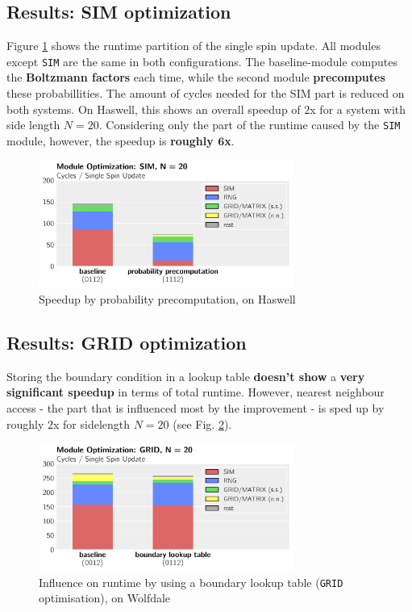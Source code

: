 \documentclass[letterpaper]{article}
\begin{document}
\subsection{Results: SIM optimization} \label{res:SIM}
Figure \ref{SIM:Has:20} shows the runtime partition of the single spin update. All modules except \texttt{SIM} are the same in both configurations. The baseline-module computes the \textbf{Boltzmann factors} each time, while the second module \textbf{precomputes} these probabillities. The amount of cycles needed for the SIM part is reduced on both systems. On Haswell, this shows an overall speedup of $2$x for a system with side length $N = 20$. Considering only the part of the runtime caused by the \texttt{SIM} module, however, the speedup is \textbf{roughly $\mathbf{6}$x}.
	\begin{figure}[h]\centering
	  \includegraphics[width = 8.36cm]{plots/dg_20_2.pdf}
	  \caption{Speedup by probability precomputation, on Haswell}
	  \label{SIM:Has:20}
	\end{figure}
\subsection{Results: GRID optimization}
Storing the boundary condition in a lookup table \textbf{doesn't show} a \textbf{very significant speedup} in terms of total runtime. However, nearest neighbour access - the part that is influenced most by the improvement - is sped up by roughly $2$x for sidelength $N = 20$ (see Fig. \ref{GRID:Wolf:20}).
	\begin{figure}[h]\centering
	  \includegraphics[width = 8.36cm]{plots/msk_20_1.pdf}
	  \caption{Influence on runtime by using a boundary lookup table (\texttt{GRID} optimisation), on Wolfdale}
	  \label{GRID:Wolf:20}
	\end{figure}
\end{document}
